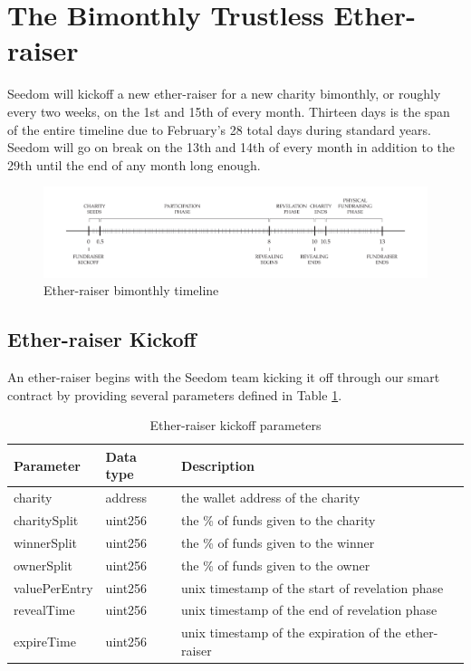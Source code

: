 \documentclass[11pt]{article}
\begin{document}
\section{The Bimonthly Trustless Ether-raiser}

Seedom will kickoff a new ether-raiser for a new charity bimonthly, or roughly every two weeks, on the 1st and 15th of every month. Thirteen days is the span of the entire timeline due to February's 28 total days during standard years. Seedom will go on break on the 13th and 14th of every month in addition to the 29th until the end of any month long enough.

\begin{figure}[H]
\begin{center}
\includegraphics[width=1.0\textwidth]{etherraiserBimonthlyTimeline.pdf}
\caption{Ether-raiser bimonthly timeline}
\label{figure:etherraiserBimonthlyTimeline}
\end{center}
\end{figure}

\subsection{Ether-raiser Kickoff}
An ether-raiser begins with the Seedom team kicking it off through our smart contract by providing several parameters defined in Table \ref{tab:etherraiserKickoffParameters}.

\begin{table}[H]
\begin{center}
\begin{tabular}{| l | l | l |}
\hline
\textbf{Parameter} & \textbf{Data type} & \textbf{Description} \\ \hline
charity & address & the wallet address of the charity \\ \hline
charitySplit & uint256 & the \% of funds given to the charity \\ \hline
winnerSplit & uint256 & the \% of funds given to the winner \\ \hline
ownerSplit & uint256 & the \% of funds given to the owner \\ \hline
valuePerEntry & uint256 & unix timestamp of the start of revelation phase \\ \hline
revealTime & uint256 & unix timestamp of the end of revelation phase \\ \hline
expireTime & uint256 & unix timestamp of the expiration of the ether-raiser \\ \hline
\end{tabular}
\caption{Ether-raiser kickoff parameters}
\label{tab:etherraiserKickoffParameters}
\end{center}
\end{table}
\end{document}
